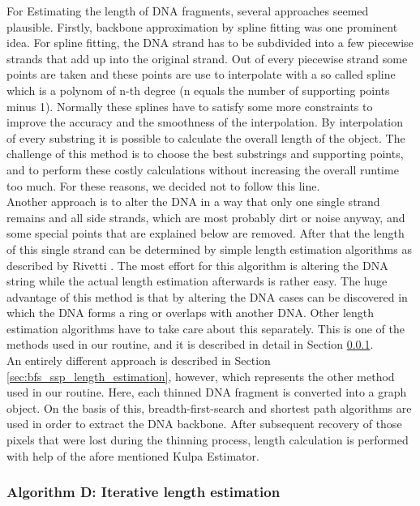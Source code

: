 \documentclass{article}
\begin{document}
For Estimating the length of DNA fragments, several approaches seemed plausible. Firstly, backbone approximation by spline fitting was one prominent idea. For spline fitting, the DNA strand has to be subdivided into a few piecewise strands that add up into the original strand. Out of every piecewise strand some points are taken and these points are use to interpolate with a so called spline which is a polynom of n-th degree (n equals the number of supporting points minus 1). Normally these splines have to satisfy some more constraints to improve the accuracy and the smoothness of the interpolation. By interpolation of every substring it is possible to calculate the overall length of the object. The challenge of this method is to choose the best substrings and supporting points, and to perform these costly calculations without increasing the overall runtime too much. For these reasons, we decided not to follow this line.\\

Another approach is to alter the DNA in a way that only one single strand remains and all side strands, which are most probably dirt or noise anyway, and some special points that are explained below are removed. After that the length of this single strand can be determined by simple length estimation algorithms as described by Rivetti \cite{rivetti2001accurate}. The most effort for this algorithm is altering the DNA string while the actual length estimation afterwards is rather easy. The huge advantage of this method is that by altering the DNA cases can be discovered in which the DNA forms a ring or overlaps with another DNA. Other length estimation algorithms have to take care about this separately. This is one of the methods used in our routine, and it is described in detail in Section \ref{sec:Iterative Length Estimation}.\\

An entirely different approach is described in Section \ref{sec:bfs_ssp_length_estimation}, however, which represents the other method used in our routine. Here, each thinned DNA fragment is converted into a graph object. On the basis of this, breadth-first-search and shortest path algorithms are used in order to extract the DNA backbone. After subsequent recovery of those pixels that were lost during the thinning process, length calculation is performed with help of the afore mentioned Kulpa Estimator.

\subsubsection{Algorithm D: Iterative length estimation}\label{sec:Iterative Length Estimation}
\end{document}
